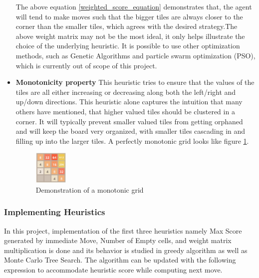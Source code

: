 \documentclass{svproc}
\begin{document}
\begin{itemize}
        The above equation \ref{weighted_score_equation} demonstrates that, the agent will tend to make moves such that the bigger tiles are always closer to the corner than the smaller tiles, which agrees with the desired strategy.The above weight matrix may not be the most ideal, it only helps illustrate the choice of the underlying heuristic.
        It is possible to use other optimization methods, such as Genetic Algorithms and particle swarm optimization (PSO), which is currently out of scope of this project.

        \item {\textbf{Monotonicity property}}
        This heuristic tries to ensure that the values of the tiles are all either increasing or decreasing along both the left/right and up/down directions. This heuristic alone captures the intuition that many others have mentioned, that higher valued tiles should be clustered in a corner. It will typically prevent smaller valued tiles from getting orphaned and will keep the board very organized, with smaller tiles cascading in and filling up into the larger tiles. A perfectly monotonic grid looks like figure \ref{fig:monotonicity}.

        \begin{figure}[h!]

            \centering
            \includegraphics[width=0.15\textwidth]{monotonicity_2048.png}
            \caption{Demonstration of a monotonic grid}
            \label{fig:monotonicity}
        \end{figure}



    \end{itemize}


    \subsubsection{Implementing Heuristics}

    In this project, implementation of the first three heuristics namely Max Score generated by immediate Move, Number of Empty cells, and weight matrix multiplication is done and its behavior is studied in greedy algorithm as well as Monte Carlo Tree Search.
    The algorithm can be updated with the following expression to accommodate heuristic score while computing next move.
\end{document}
